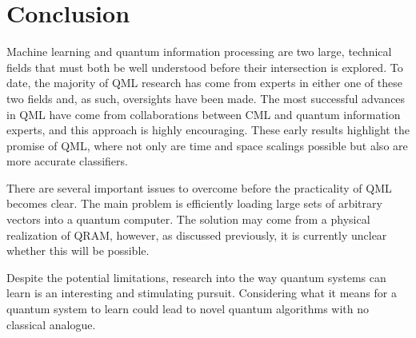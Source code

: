\chapter{Conclusion}\label{ch:conclusion}
Machine learning and quantum information processing are two large, technical fields that must both be well understood before their intersection is explored. To date, the majority of QML research has come from experts in either one of these two fields and, as such, oversights have been made. The most successful advances in QML have come from collaborations between CML and quantum information experts, and this approach is highly encouraging. These early results highlight the promise of QML, where not only are time and space scalings possible but also are more accurate classifiers.\par\bigskip
There are several important issues to overcome before the practicality of QML becomes clear. The main problem is efficiently loading large sets of arbitrary vectors into a quantum computer. The solution may come from a physical realization of QRAM, however, as discussed previously, it is currently unclear whether this will be possible.\par\bigskip
Despite the potential limitations, research into the way quantum systems can learn is an interesting and stimulating pursuit. 
Considering what it means for a quantum system to learn could lead to novel quantum algorithms with no classical analogue.
